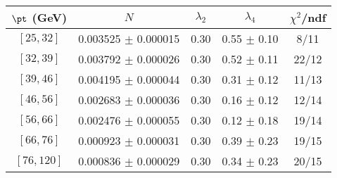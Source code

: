 \begin{tabular}{c||c|c|c|c}
$\pt$ (GeV) & $N$ & $\lambda_{2}$ & $\lambda_4$  & $\chi^2$/ndf  \\
\hline
$[25, 32]$ & 0.003525 $\pm$ 0.000015 & 0.30 & 0.55 $\pm$ 0.10 & 8/11\\
$[32, 39]$ & 0.003792 $\pm$ 0.000026 & 0.30 & 0.52 $\pm$ 0.11 & 22/12\\
$[39, 46]$ & 0.004195 $\pm$ 0.000044 & 0.30 & 0.31 $\pm$ 0.12 & 11/13\\
$[46, 56]$ & 0.002683 $\pm$ 0.000036 & 0.30 & 0.16 $\pm$ 0.12 & 12/14\\
$[56, 66]$ & 0.002476 $\pm$ 0.000055 & 0.30 & 0.12 $\pm$ 0.18 & 19/14\\
$[66, 76]$ & 0.000923 $\pm$ 0.000031 & 0.30 & 0.39 $\pm$ 0.23 & 19/15\\
$[76, 120]$ & 0.000836 $\pm$ 0.000029 & 0.30 & 0.34 $\pm$ 0.23 & 20/15\\
\end{tabular}
